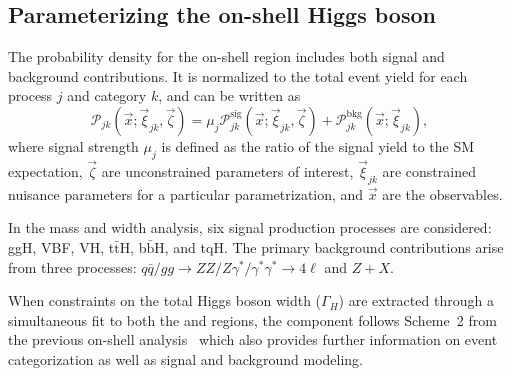 \subsection{Parameterizing the on-shell Higgs boson} \label{sec:onshell}

The probability density for the on-shell region includes both signal and background contributions.  It is normalized to the total event yield for each process $j$ and category $k$, and can be written as
\begin{equation}
  \mathcal{P}_{jk}(\vec{x};\vec{\xi}_{jk},\vec\zeta) = 
  \mu_j\mathcal{P}_{jk}^\text{sig} (\vec{x};\vec{\xi}_{jk},\vec\zeta) +
  \mathcal{P}_{jk}^\text{bkg}(\vec{x};\vec{\xi}_{jk}),
  \label{eq:ponshell}
\end{equation}
where signal strength $\mu_j$ is defined as the ratio of the signal yield to the SM expectation, $\vec\zeta$ are unconstrained parameters of interest, $\vec{\xi}_{jk}$ are constrained nuisance parameters for a particular parametrization,
and $\vec{x}$ are the observables.

In the \onshell \Hboson mass and width analysis, six signal production processes are considered: ggH, VBF, VH, t$\bar{\text{t}}$H, b$\bar{\text{b}}$H, and tqH. The primary background contributions arise from three processes: $q\bar{q}/gg \to ZZ/Z\gamma^*/\gamma^*\gamma^* \to 4\ell$ and $Z+X$. 

When constraints on the total Higgs boson width ($\Gamma_H$) are extracted through a simultaneous fit to both the \onshell and \offshell regions, the \onshell component follows Scheme~2 from the previous on-shell analysis~\cite{CMS:2021nnc} which also provides further information on event categorization as well as signal and background modeling.



